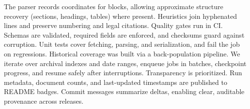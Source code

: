 \documentclass[10pt,a4paper]{article}%
\begin{document}
The parser records coordinates for blocks, allowing approximate structure recovery (sections, headings, tables) where present. Heuristics join hyphenated lines and preserve numbering and legal citations.%
\cite{DocumentLayoutAnalysis2021}%
\newline%
\newline%
Quality gates run in CI. Schemas are validated, required fields are enforced, and checksums guard against corruption. Unit tests cover fetching, parsing, and serialization, and fail the job on regressions.%
\cite{DataQuality2022}%
\newline%
\newline%
Historical coverage was built via a back{-}population pipeline. We iterate over archival indexes and date ranges, enqueue jobs in batches, checkpoint progress, and resume safely after interruptions.%
\cite{HistoricalWebData2019}%
\newline%
\newline%
Transparency is prioritized. Run metadata, document counts, and last{-}updated timestamps are published to README badges. Commit messages summarize deltas, enabling clear, auditable provenance across releases.%
\cite{OpenDataPractices2020}%
\newline%
\newline

%
\end{document}
